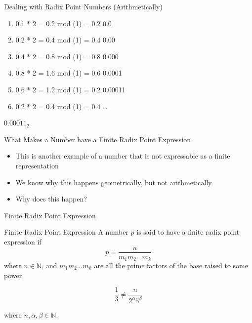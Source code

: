 \documentclass{beamer}
\begin{document}
        \begin{frame}{Dealing with Radix Point Numbers (Arithmetically)}
          \begin{example}\pause
            \begin{enumerate}
              \item[] 0.1 * 2 = 0.2  mod (1) = 0.2 \hfill 0.0\pause
              \item[] 0.2 * 2 = 0.4  mod (1) = 0.4 \hfill 0.00\pause
              \item[] 0.4 * 2 = 0.8  mod (1) = 0.8 \hfill 0.000\pause
              \item[] 0.8 * 2 = 1.6  mod (1) = 0.6 \hfill 0.0001\pause
              \item[] 0.6 * 2 = 1.2  mod (1) = 0.2 \hfill 0.00011\pause
              \item[] 0.2 * 2 = 0.4  mod (1) = 0.4 \hfill\dots\pause
            \end{enumerate}
            \hfill $0.0\overline{0011}_2$
          \end{example}
        \end{frame}

        \begin{frame}{What Makes a Number have a Finite Radix Point Expression}
          \begin{itemize}
            \item This is another example of a number that is not expressable as a finite representation
            \item We know why this happens geometrically, but not arithmetically
            \item Why does this happen?
          \end{itemize}
        \end{frame}

        \begin{frame}{Finite Radix Point Expression}
          \begin{block}{Finite Radix Point Expression}
            A number $p$ is said to have a finite radix point expression if $$p=\frac{n}{m_1 m_2\dots m_k}$$ where $n\in\mathbb{N}$, and $m_1 m_2 \dots m_k$ are all the prime factors of the base raised to some power 
            \end{block}\pause

            \begin{example}[1/3 in Base 10]
              $$\frac{1}{3} \neq \frac{n}{2^\alpha 5^\beta}$$

              where $n,\alpha,\beta\in\mathbb{N}$.
            \end{example}
          \end{frame}
\end{document}
